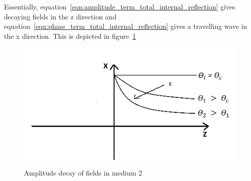 Essentially, equation~\ref{eqn:amplitude_term_total_internal_reflection} gives decaying fields in the z direction and equation~\ref{eqn:phase_term_total_internal_reflection}  gives a travelling wave in the x direction. This is depicted in figure~\ref{fig:amplitude_decay_total_internal_reflection}
\begin{figure}[h]
\centering
\includegraphics[width=1\linewidth]{graphics/amplitude_decay}
\caption{Amplitude decay of fields in medium 2}
\label{fig:amplitude_decay_total_internal_reflection}
\end{figure}

